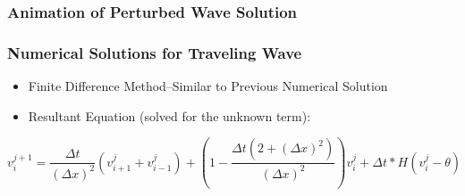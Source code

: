 \documentclass{beamer}
\begin{document}
\begin{frame}
\frametitle{Animation of Perturbed Wave Solution}
\end{frame}

\begin{frame}
\frametitle{Numerical Solutions for Traveling Wave}
\begin{itemize}
	\item{Finite Difference Method--Similar to Previous Numerical Solution}
	\item{Resultant Equation (solved for the unknown term):}
\end{itemize}
\[v^{j+1}_i=\frac{\Delta{t}}{(\Delta{x})^2}(v^{j}_{i+1}+v^{j}_{i-1})+(1-\frac{\Delta{t}(2+(\Delta{x})^2)}{(\Delta{x})^2})v^{j}_{i}+\Delta{t}*H(v^j_i-\theta)\]


\end{frame}
\end{document}
